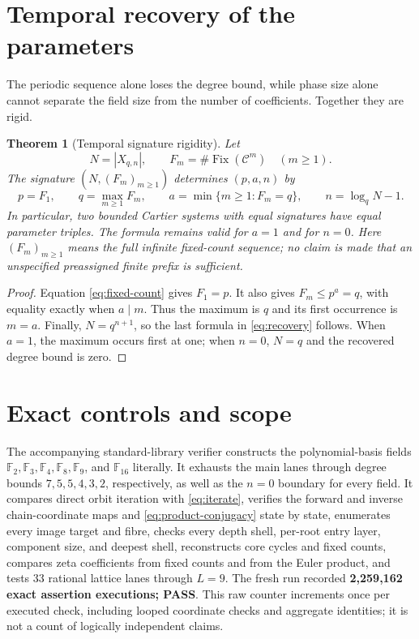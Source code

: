 \documentclass[10pt,a4paper]{amsart}
\newtheorem{theorem}{Theorem}[section]
\theoremstyle{definition}
\theoremstyle{remark}
\newcommand{\F}{\mathbb F}
\newcommand{\Fix}{\operatorname{Fix}}
\begin{document}
\section{Temporal recovery of the parameters}
\label{sec:recovery}

The periodic sequence alone loses the degree bound, while phase size alone
cannot separate the field size from the number of coefficients.  Together
they are rigid.

\begin{theorem}[Temporal signature rigidity]
\label{thm:recovery}
Let
\[
 N=|X_{q,n}|,
 \qquad F_m=\#\Fix(\mathcal C^m)\quad(m\ge1).
\]
The signature $(N,(F_m)_{m\ge1})$ determines $(p,a,n)$ by
\begin{equation}
 \boxed{\quad
 p=F_1,\qquad
 q=\max_{m\ge1}F_m,\qquad
 a=\min\{m\ge1:F_m=q\},\qquad
 n=\log_qN-1.
 \quad}
 \label{eq:recovery}
\end{equation}
In particular, two bounded Cartier systems with equal signatures have equal
parameter triples.  The formula remains valid for $a=1$ and for $n=0$.
Here $(F_m)_{m\ge1}$ means the full infinite fixed-count sequence; no claim
is made that an unspecified preassigned finite prefix is sufficient.
\end{theorem}

\begin{proof}
Equation \eqref{eq:fixed-count} gives $F_1=p$.  It also gives
$F_m\le p^a=q$, with equality exactly when $a\mid m$.  Thus the maximum is
$q$ and its first occurrence is $m=a$.  Finally,
$N=q^{n+1}$, so the last formula in \eqref{eq:recovery} follows.  When
$a=1$, the maximum occurs first at one; when $n=0$, $N=q$ and the recovered
degree bound is zero.
\end{proof}

\section{Exact controls and scope}
\label{sec:controls}

The accompanying standard-library verifier constructs the polynomial-basis
fields $\F_2,\F_3,\F_4,\F_8,\F_9$, and $\F_{16}$ literally.  It exhausts the
main lanes through degree bounds $7,5,5,4,3,2$, respectively, as well as the
$n=0$ boundary for every field.  It compares direct orbit iteration with
\eqref{eq:iterate}, verifies the forward and inverse chain-coordinate maps
and \eqref{eq:product-conjugacy} state by state, enumerates every image target
and fibre, checks every depth shell, per-root entry layer, component size,
and deepest shell, reconstructs core cycles and fixed counts, compares zeta
coefficients from fixed counts and from the Euler product, and tests 33
rational lattice lanes through $L=9$.  The fresh run recorded
\textbf{2,259,162 exact assertion executions; PASS}.  This raw counter
increments once per executed check, including looped coordinate checks and
aggregate identities; it is not a count of logically independent claims.
\end{document}
